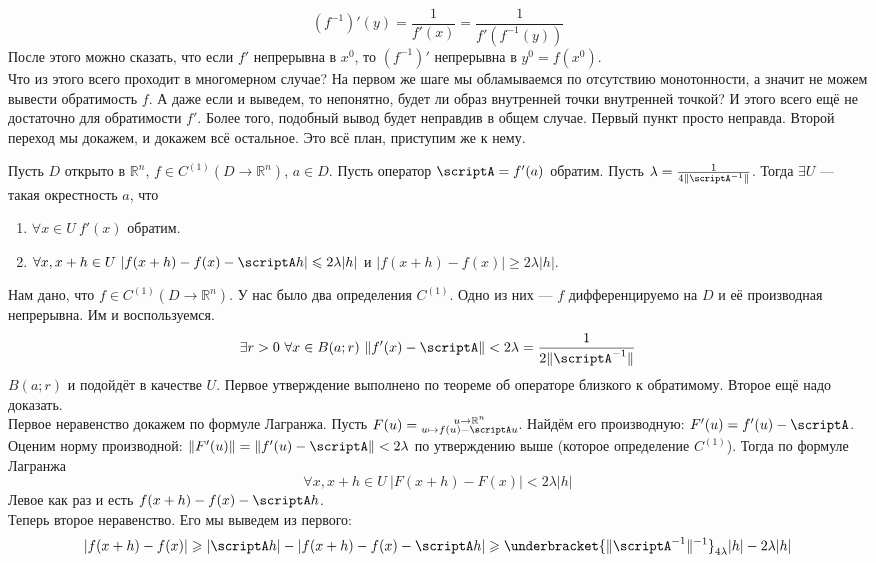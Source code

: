 \documentclass{article}
\begin{document}
\begin{itemize}
\begin{Comment}
            $$
            (f^{-1})'(y)=\frac1{f'(x)}=\frac1{f'(f^{-1}(y))}
            $$
            После этого можно сказать, что если $f'$ непрерывна в $x^0$, то $(f^{-1})'$ непрерывна в $y^0=f(x^0)$.\\
            Что из этого всего проходит в многомерном случае? На первом же шаге мы обламываемся по отсутствию монотонности, а значит не можем вывести обратимость $f$. А даже если и выведем, то непонятно, будет ли образ внутренней точки внутренней точкой? И этого всего ещё не достаточно для обратимости $f'$. Более того, подобный вывод будет неправдив в общем случае. Первый пункт просто неправда. Второй переход мы докажем, и докажем всё остальное. Это всё план, приступим же к нему.
        \end{Comment}
        \thm Пусть $D$ открыто в $\mathbb R^n$, $f\in C^{(1)}(D\to\mathbb R^n)$, $a\in D$. Пусть оператор $\scriptA=f'(a)$ обратим. Пусть $\lambda=\frac1{4\|\scriptA^{-1}\|}$. Тогда $\exists U$ --- такая окрестность $a$, что
        \begin{enumerate}
            \item $\forall x\in U~f'(x)$ обратим.
            \item $\forall x,x+h\in U~|f(x+h)-f(x)-\scriptA h|\leqslant 2\lambda|h|$ и $|f(x+h)-f(x)|\geqslant2\lambda|h|$.
        \end{enumerate}
        \begin{Proof}
            Нам дано, что $f\in C^{(1)}(D\to\mathbb R^n)$. У нас было два определения $C^{(1)}$. Одно из них --- $f$ дифференцируемо на $D$ и её производная непрерывна. Им и воспользуемся.
            $$\exists r>0~\forall x\in B(a;r)~\|f'(x)-\scriptA\|<2\lambda=\frac1{2\|\scriptA^{-1}\|}$$
            $B(a;r)$ и подойдёт в качестве $U$. Первое утверждение выполнено по теореме об операторе близкого к обратимому. Второе ещё надо доказать.\\
            Первое неравенство докажем по формуле Лагранжа. Пусть $F(u)=\substack{u\to\mathbb R^n\\u\mapsto f(u)-\scriptA u}$. Найдём его производную: $F'(u)=f'(u)-\scriptA$. Оценим норму производной: $\|F'(u)\|=\|f'(u)-\scriptA\|<2\lambda$ по утверждению выше (которое определение $C^{(1)}$). Тогда по формуле Лагранжа
            $$\forall x,x+h\in U~|F(x+h)-F(x)|<2\lambda|h|$$
            Левое как раз и есть $f(x+h)-f(x)-\scriptA h$.\\
            Теперь второе неравенство. Его мы выведем из первого:
            $$
            |f(x+h)-f(x)|\geqslant|\scriptA h|-|f(x+h)-f(x)-\scriptA h|\geqslant\underbracket{\|\scriptA^{-1}\|^{-1}}_{4\lambda}|h|-2\lambda|h|
$$
\end{Proof}
\end{itemize}
\end{document}
